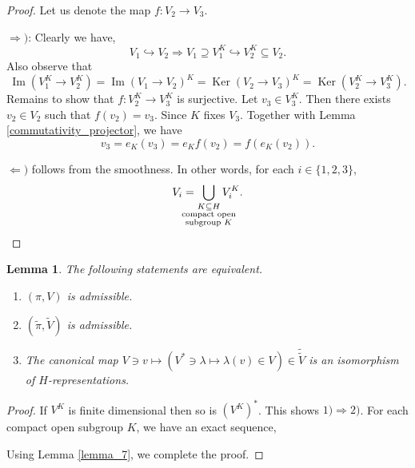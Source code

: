 \documentclass[8pt]{article}
\newtheorem{lemma}{Lemma}[section]
\DeclareMathOperator{\Image}{Im}
\DeclareMathOperator{\Ker}{Ker}
\begin{document}
\begin{proof}
Let us denote the map $f:V_2\rightarrow V_3$.
\par $\Rightarrow)$: Clearly we have,
\begin{equation*}
V_1\hookrightarrow V_2\Rightarrow V_1\supseteq V_1^K\hookrightarrow V_2^K\subseteq V_2.
\end{equation*}
Also observe that 
\begin{equation*}
\Image(V_1^K\to V_2^K) = \Image(V_1\to V_2)^K = \Ker (V_2\to V_3)^K = \Ker(V_2^K\to V_3^K).
\end{equation*}
Remains to show that $f:V_2^K\to V_3^K$ is surjective. Let $v_3\in V_3^K$. Then there exists $v_2\in V_2$ such that $f(v_2)=v_3$. Since $K$ fixes $V_3$. Together with Lemma \ref{commutativity_projector}, we have
\begin{equation*}
v_3 = e_K(v_3) = e_Kf(v_2) = f(e_K(v_2)).
\end{equation*}
\par $\Leftarrow)$ follows from the smoothness. In other words, for each $i\in\{1,2,3\}$,
\begin{equation*}
V_i = \bigcup_{\substack{K\subseteq H\\ \text{\makebox[0pt][c]{compact open}}\\\text{\makebox[0pt][c]{subgroup $K$}}}}V_i^K.
\end{equation*}
\end{proof}

\begin{lemma}
  \label{lemma_6}
The following statements are equivalent.
\begin{enumerate}[1.]
\item $(\pi,V)$ is admissible.
\item $(\widetilde{\pi},\widetilde{V})$ is admissible.
\item The canonical map $V\ni v\mapsto (V^*\ni\lambda\mapsto\lambda(v)\in V)\in \widetilde{\widetilde{V}}$ is an isomorphism of $H$-representations.
\end{enumerate}
\label{characteristics_admissiblity}
\end{lemma}

\begin{proof}
If $V^K$ is finite dimensional then so is $(V^K)^*$. This shows $1)\Rightarrow2)$. For each compact open subgroup $K$, we have an exact sequence,
\begin{center}
\end{center}
Using Lemma \ref{lemma_7}, we complete the proof.
\end{proof}
\end{document}
